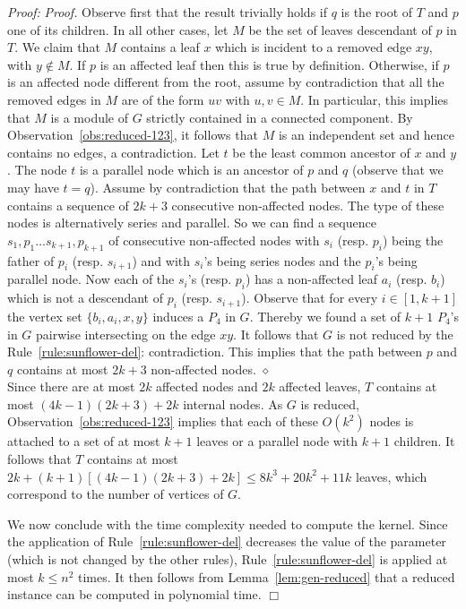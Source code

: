 \documentclass[11pt]{article}
\newenvironment{proof}{\noindent\textit{Proof: }}{{\hfill $\Box$}}
\begin{document}
\begin{proof}
\emph{Proof.} Observe first that the result trivially holds if $q$ is the root of $T$ and $p$ one of its children. In all other cases, let $M$ be the set of leaves descendant of $p$ in $T$. We claim that $M$ contains a leaf $x$ which is incident to a removed edge $xy$, with $y \notin M$. If $p$ is an affected leaf then this is true by definition. Otherwise, if $p$ is an affected node different from the root, assume by contradiction that all the removed edges in $M$ are of the form $uv$ with $u,v \in M$. In particular, this implies that $M$ is a module of $G$ strictly contained in a connected component. By Observation~\ref{obs:reduced-123}, it follows that $M$ is an independent set and hence contains no edges, a contradiction. 
Let $t$ be the least common ancestor of $x$ and $y$. The node $t$ is a parallel node which is an ancestor of $p$ and $q$ (observe that we may have $t = q$). Assume by contradiction that the path between $x$ and $t$ in $T$ contains a sequence of $2k+3$ consecutive non-affected nodes. The type of these nodes is alternatively series and parallel. So we can find a sequence $s_1, p_1\dots s_{k+1}, p_{k+1}$ of consecutive non-affected nodes with $s_i$ (resp. $p_i$) being the father of $p_i$ (resp. $s_{i+1}$) and with $s_i$'s being series nodes and the $p_i$'s being parallel node. Now each of the $s_i$'s (resp. $p_i$) has a non-affected leaf $a_i$ (resp. $b_i$) which is not a descendant of $p_i$ (resp. $s_{i+1}$). Observe that for every $i\in [1,k+1]$ the vertex set $\{b_i,a_i,x,y\}$ induces a $P_4$ in $G$. Thereby we found a set of $k+1$ $P_4$'s in $G$ pairwise intersecting on the edge $xy$. It follows that $G$ is not reduced by the Rule~\ref{rule:sunflower-del}: contradiction. This implies that the path between $p$ and $q$ contains at most $2k + 3$ non-affected nodes. 
\hfill $\diamond$ \\

Since there are at most $2k$ affected nodes and $2k$ affected leaves, $T$ contains at most $(4k-1)(2k+3) + 2k$ internal nodes.
As $G$ is reduced, Observation~\ref{obs:reduced-123} implies that each of these $O(k^2)$ nodes is attached to a set of at most $k+1$ leaves or a parallel node with $k+1$ children. It follows that $T$ contains at most $2k + (k+1)[(4k-1)(2k+3) + 2k] \leqslant 8k^3 + 20k^2 + 11k$ leaves, which correspond to the number of vertices of $G$. 

\medskip
We now conclude with the time complexity needed to compute the kernel. Since the application of Rule~\ref{rule:sunflower-del} decreases the value of the parameter (which is not changed by the other rules), Rule~\ref{rule:sunflower-del} is applied at most $k\leqslant n^2$ times. It then follows from Lemma~\ref{lem:gen-reduced} that a reduced instance can be computed in polynomial time.
 \end{proof}\\
 
\end{document}
